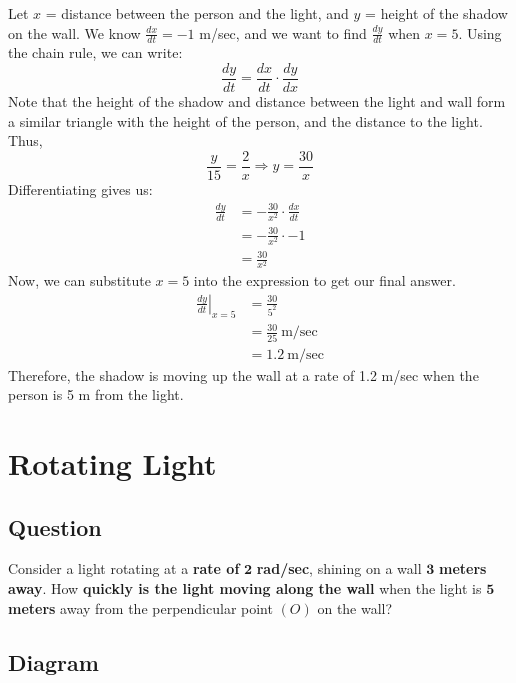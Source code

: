 \documentclass[12pt]{article}
\newcommand\at[2]{\left.#1\right|_{#2}}
\begin{document}
Let $ x $ = distance between the person and the light, and $ y $ = height of the shadow on the wall.
\medskip
\newline
We know $ \frac{dx}{dt} = -1 $ m/sec, and we want to find $ \frac{dy}{dt} $ when $ x = 5 $. Using the chain rule, we can write:
\[ \frac{dy}{dt} = \frac{dx}{dt} \cdot \frac{dy}{dx} \]
Note that the height of the shadow and distance between the light and wall form a similar triangle with the height of the person, and the distance to the light. Thus,
\[ \frac{y}{15} = \frac{2}{x} \Longrightarrow y = \frac{30}{x} \]
Differentiating gives us:
\begin{align*}
    \frac{dy}{dt} & = - \frac{30}{x^2} \cdot \frac{dx}{dt} \\
    & = -\frac{30}{x^2} \cdot -1 \\
    & = \frac{30}{x^2}
\end{align*}
Now, we can substitute $ x = 5 $ into the expression to get our final answer.
\begin{align*}
    \at{\frac{dy}{dt}}{x = 5} & = \frac{30}{5^2} \\
    & = \frac{30}{25} \ \text{m/sec} \\
    & = 1.2 \ \text{m/sec}
\end{align*}
Therefore, the shadow is moving up the wall at a rate of 1.2 m/sec when the person is 5 m from the light.

\section*{Rotating Light}

\subsection*{Question}

Consider a light rotating at a \textbf{rate of} $ \mathbf{2} $ \textbf{rad/sec}, shining on a wall $ \mathbf{3} $ \textbf{meters away}. How \textbf{quickly is the light moving along the wall} when the light is $ \mathbf{5} $ \textbf{meters} away from the perpendicular point $ (O) $ on the wall?

\subsection*{Diagram}

\begin{center}
\end{center}
\end{document}
